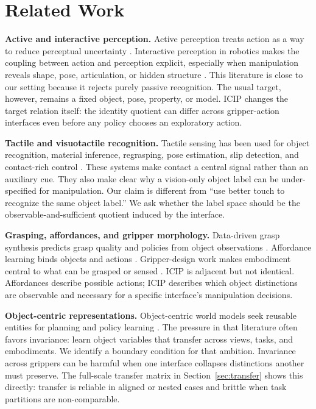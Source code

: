 \documentclass{article}
\newcommand{\icip}{\textsc{ICIP}}
\begin{document}
\section{Related Work}

\textbf{Active and interactive perception.}
Active perception treats action as a way to reduce perceptual uncertainty \citep{bajcsy1988active}.
Interactive perception in robotics makes the coupling between action and perception explicit, especially when manipulation reveals shape, pose, articulation, or hidden structure \citep{katz2011interactive,bohg2017interactive,hausman2015active,pajarinen2019active}.
This literature is close to our setting because it rejects purely passive recognition.
The usual target, however, remains a fixed object, pose, property, or model.
\icip{} changes the target relation itself: the identity quotient can differ across gripper-action interfaces even before any policy chooses an exploratory action.

\textbf{Tactile and visuotactile recognition.}
Tactile sensing has been used for object recognition, material inference, regrasping, pose estimation, slip detection, and contact-rich control \citep{chitta2010tactile,calandra2018more,yuan2017gelsight,lee2019making}.
These systems make contact a central signal rather than an auxiliary cue.
They also make clear why a vision-only object label can be under-specified for manipulation.
Our claim is different from ``use better touch to recognize the same object label.''
We ask whether the label space should be the observable-and-sufficient quotient induced by the interface.

\textbf{Grasping, affordances, and gripper morphology.}
Data-driven grasp synthesis predicts grasp quality and policies from object observations \citep{bohg2014data,mahler2017dexnet,pinto2016supersizing}.
Affordance learning binds objects and actions \citep{gibson1979ecological,do2018affordancenet}.
Gripper-design work makes embodiment central to what can be grasped or sensed \citep{ruth2021,slipaware2025,softgripper2026}.
\icip{} is adjacent but not identical.
Affordances describe possible actions; \icip{} describes which object distinctions are observable and necessary for a specific interface's manipulation decisions.

\textbf{Object-centric representations.}
Object-centric world models seek reusable entities for planning and policy learning \citep{greff2020binding,veerapaneni2020entity}.
The pressure in that literature often favors invariance: learn object variables that transfer across views, tasks, and embodiments.
We identify a boundary condition for that ambition.
Invariance across grippers can be harmful when one interface collapses distinctions another must preserve.
The full-scale transfer matrix in Section~\ref{sec:transfer} shows this directly: transfer is reliable in aligned or nested cases and brittle when task partitions are non-comparable.
\end{document}
